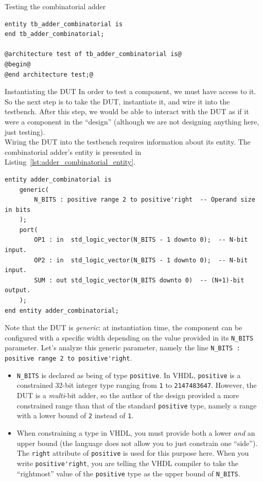 \documentclass[lab]{course}
\begin{document}
\begin{section}{Testing the combinatorial adder}
\begin{lstlisting}[caption={Add libraries \& empty architecture}, label={lst:combinatorial_add_libraries_and_empty_architecture}]
entity tb_adder_combinatorial is
end tb_adder_combinatorial;

@architecture test of tb_adder_combinatorial is@
@begin@
@end architecture test;@
    \end{lstlisting}

    \begin{subsection}{Instantiating the DUT}
        \label{sec:combinatorial_instantiating_dut}
        In order to test a component, we must have access to it. So the next step is to take the DUT, instantiate it, and wire it into the testbench. After this step, we would be able to interact with the DUT as if it were a component in the ``design'' (although we are not designing anything here, just testing). \\

        Wiring the DUT into the testbench requires information about its entity. The combinatorial adder's entity is presented in Listing~\ref{lst:adder_combinatorial_entity}.

        \begin{lstlisting}[caption={\texttt{adder\_combinatorial} entity}, label={lst:adder_combinatorial_entity}]
entity adder_combinatorial is
    generic(
        N_BITS : positive range 2 to positive'right  -- Operand size in bits
    );
    port(
        OP1 : in  std_logic_vector(N_BITS - 1 downto 0);  -- N-bit input.
        OP2 : in  std_logic_vector(N_BITS - 1 downto 0);  -- N-bit input.
        SUM : out std_logic_vector(N_BITS downto 0)  -- (N+1)-bit output.
    );
end entity adder_combinatorial;
        \end{lstlisting}

        Note that the DUT is \emph{generic}: at instantiation time, the component can be configured with a specific width depending on the value provided in its \verb+N_BITS+ parameter. Let's analyze this generic parameter, namely the line \verb+N_BITS : positive range 2 to positive'right+.

        \begin{itemize}
            \item \verb+N_BITS+ is declared as being of type \verb+positive+. In VHDL, \verb+positive+ is a constrained 32-bit integer type ranging from \verb+1+ to \verb+2147483647+. However, the DUT is a \emph{multi}-bit adder, so the author of the design provided a more constrained range than that of the standard \verb+positive+ type, namely a range with a lower bound of \verb+2+ instead of \verb+1+.

            \item When constraining a type in VHDL, you must provide both a lower \emph{and} an upper bound (the language does not allow you to just constrain one ``side''). The \verb+right+ attribute of \verb+positive+ is used for this purpose here. When you write \verb+positive'right+, you are telling the VHDL compiler to take the ``rightmost'' value of the \verb+positive+ type as the upper bound of \verb+N_BITS+.
        \end{itemize}


\end{subsection}
\end{section}
\end{document}
